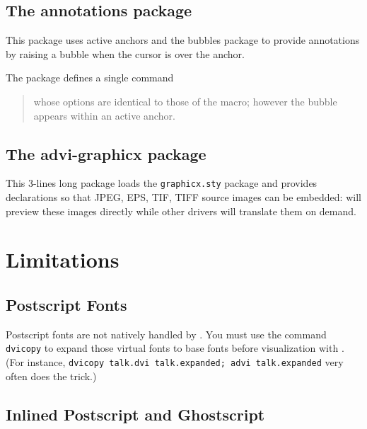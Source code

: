 \documentclass[12pt]{article}
\begin{document}
\subsection{The annotations package}

This package uses active anchors and the bubbles package to 
provide annotations by raising a bubble when the cursor is over the anchor.

The package defines a single command

\medskip\noindent
\docdef \adviannot {}%
\begin{quote}
whose options are identical to those of the \docdef \bubble macro; however
the bubble appears within an active anchor.
\end{quote}


\subsection{\label {advi-grahicx}The advi-graphicx package}

This 3-lines long package loads the {\tt graphicx.sty} package and provides
declarations so that JPEG, EPS, TIF, TIFF source images can be embedded:
{\ActiveDVI} will preview these images directly while other drivers
will translate them on demand. 

\appendix

\section{Limitations}

\subsection*{Postscript Fonts}

Postscript fonts are not natively handled by {\ActiveDVI}. You must
use the command {\tt dvicopy} to expand those virtual fonts to base
fonts before visualization with {\ActiveDVI}.
(For instance, {\tt dvicopy talk.dvi talk.expanded; advi talk.expanded} very
often does the trick.)

\subsection*{Inlined Postscript and Ghostscript}
\end{document}
